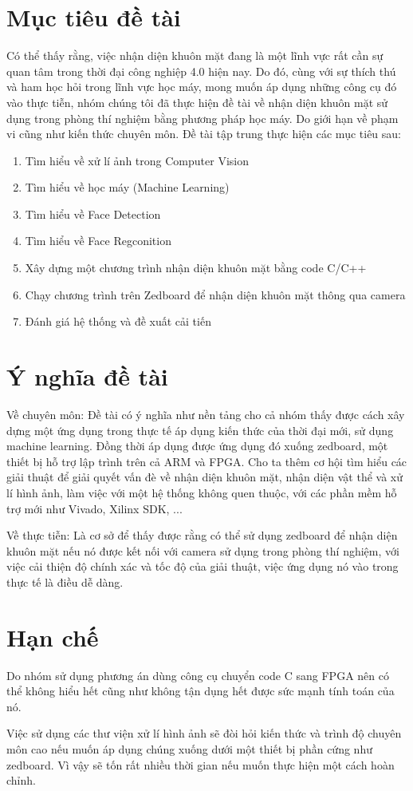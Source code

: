 \documentclass[a4paper]{report}
\begin{document}
\section{Mục tiêu đề tài}
Có thể thấy rằng, việc nhận diện khuôn mặt đang là một lĩnh vực rất cần sự quan tâm trong thời đại công nghiệp 4.0 hiện nay. Do đó, cùng với sự thích thú và ham học hỏi trong lĩnh vực học máy, mong muốn áp dụng những công cụ đó vào thực tiễn, nhóm chúng tôi đã thực hiện đề tài về nhận diện khuôn mặt sử dụng trong phòng thí nghiệm bằng phương pháp học máy. Do giới hạn về phạm vi cũng như kiến thức chuyên môn. Đề tài tập trung thực hiện các mục tiêu sau:
\begin{enumerate}
\item Tìm hiểu về xử lí ảnh trong Computer Vision
\item Tìm hiểu về học máy (Machine Learning)
\item Tìm hiểu về Face Detection
\item Tìm hiểu về Face Regconition
\item Xây dựng một chương trình nhận diện khuôn mặt bằng code C/C++
\item Chạy chương trình trên Zedboard để nhận diện khuôn mặt thông qua camera
\item Đánh giá hệ thống và đề xuất cải tiến
\end{enumerate}
\section{Ý nghĩa đề tài}
Về chuyên môn: Đề tài có ý nghĩa như nền tảng cho cả nhóm thấy được cách xây dựng một ứng dụng trong thực tế áp dụng kiến thức của thời đại mới, sử dụng machine learning. Đồng thời áp dụng được ứng dụng đó xuống zedboard, một thiết bị hỗ trợ lập trình trên cả ARM và FPGA. Cho ta thêm cơ hội tìm hiểu các giải thuật để giải quyết vấn đè về nhận diện khuôn mặt, nhận diện vật thể và xử lí hình ảnh, làm việc với một hệ thống không quen thuộc, với các phần mềm hỗ trợ mới như Vivado, Xilinx SDK, ...
\par\noindent
Về thực tiễn: Là cơ sở để thấy được rằng có thể sử dụng zedboard để nhận diện khuôn mặt nếu nó được kết nối với camera sử dụng trong phòng thí nghiệm, với việc cải thiện độ chính xác và tốc độ của giải thuật, việc ứng dụng nó vào trong thực tế là điều dễ dàng.
\section{Hạn chế}
Do nhóm sử dụng phương án dùng công cụ chuyển code C sang FPGA nên có thể không hiểu hết cũng như không tận dụng hết được sức mạnh tính toán của nó.
\par\noindent
Việc sử dụng các thư viện xử lí hình ảnh sẽ đòi hỏi kiến thức và trình độ chuyên môn cao nếu muốn áp dụng chúng xuống dưới một thiết bị phần cứng như zedboard. Vì vậy sẽ tốn rất nhiều thời gian nếu muốn thực hiện một cách hoàn chỉnh.
\end{document}
